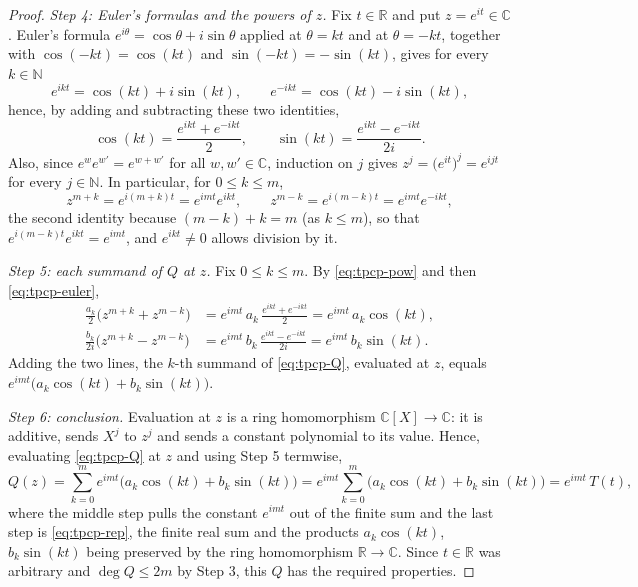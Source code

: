 \begin{proof}
\emph{Step 4: Euler's formulas and the powers of $z$.} Fix $t\in\mathbb{R}$ and
put $z=e^{it}\in\mathbb{C}$. Euler's formula $e^{i\theta}=\cos\theta+i\sin\theta$
applied at $\theta=kt$ and at $\theta=-kt$, together with $\cos(-kt)=\cos(kt)$
and $\sin(-kt)=-\sin(kt)$, gives for every $k\in\mathbb{N}$
\[
  e^{ikt}=\cos(kt)+i\sin(kt),\qquad e^{-ikt}=\cos(kt)-i\sin(kt),
\]
hence, by adding and subtracting these two identities,
\begin{equation}\label{eq:tpcp-euler}
  \cos(kt)=\frac{e^{ikt}+e^{-ikt}}{2},\qquad
  \sin(kt)=\frac{e^{ikt}-e^{-ikt}}{2i}.
\end{equation}
Also, since $e^{w}e^{w'}=e^{w+w'}$ for all $w,w'\in\mathbb{C}$, induction on
$j$ gives $z^{j}=\bigl(e^{it}\bigr)^{j}=e^{ijt}$ for every $j\in\mathbb{N}$. In
particular, for $0\le k\le m$,
\begin{equation}\label{eq:tpcp-pow}
  z^{m+k}=e^{i(m+k)t}=e^{imt}e^{ikt},
  \qquad
  z^{m-k}=e^{i(m-k)t}=e^{imt}e^{-ikt},
\end{equation}
the second identity because $(m-k)+k=m$ (as $k\le m$), so that
$e^{i(m-k)t}e^{ikt}=e^{imt}$, and $e^{ikt}\ne0$ allows division by it.

\emph{Step 5: each summand of $Q$ at $z$.} Fix $0\le k\le m$. By
\eqref{eq:tpcp-pow} and then \eqref{eq:tpcp-euler},
\begin{align*}
  \frac{a_k}{2}\bigl(z^{m+k}+z^{m-k}\bigr)
   &=e^{imt}\,a_k\,\frac{e^{ikt}+e^{-ikt}}{2}=e^{imt}\,a_k\cos(kt),\\
  \frac{b_k}{2i}\bigl(z^{m+k}-z^{m-k}\bigr)
   &=e^{imt}\,b_k\,\frac{e^{ikt}-e^{-ikt}}{2i}=e^{imt}\,b_k\sin(kt).
\end{align*}
Adding the two lines, the $k$-th summand of \eqref{eq:tpcp-Q}, evaluated at
$z$, equals $e^{imt}\bigl(a_k\cos(kt)+b_k\sin(kt)\bigr)$.

\emph{Step 6: conclusion.} Evaluation at $z$ is a ring homomorphism
$\mathbb{C}[X]\to\mathbb{C}$: it is additive, sends $X^{j}$ to $z^{j}$ and sends
a constant polynomial to its value. Hence, evaluating \eqref{eq:tpcp-Q} at $z$
and using Step 5 termwise,
\[
  Q(z)=\sum_{k=0}^{m}e^{imt}\bigl(a_k\cos(kt)+b_k\sin(kt)\bigr)
      =e^{imt}\sum_{k=0}^{m}\bigl(a_k\cos(kt)+b_k\sin(kt)\bigr)
      =e^{imt}\,T(t),
\]
where the middle step pulls the constant $e^{imt}$ out of the finite sum and the
last step is \eqref{eq:tpcp-rep}, the finite real sum and the products
$a_k\cos(kt)$, $b_k\sin(kt)$ being preserved by the ring homomorphism
$\mathbb{R}\to\mathbb{C}$. Since $t\in\mathbb{R}$ was arbitrary and
$\deg Q\le 2m$ by Step 3, this $Q$ has the required properties.
\end{proof}
